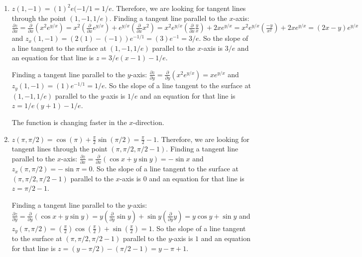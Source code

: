 \begin{Answer}[ref = tangent]
\begin{enumerate}
    \item $z(1, -1) = (1)^2e({-1/1} = 1/e$. Therefore, we are looking for 
    tangent lines through the point $(1, -1, 1/e)$. Finding a tangent line 
    parallel to the $x$-axis: $\frac{\partial z}{\partial x} = \frac{\partial}{
    \partial x} \left( x^2e^{y/x} \right) = x^2 \left( \frac{\partial}{\partial
    x}e^{y/x} \right) + e^{y/x} \left( \frac{\partial}{\partial x}x^2 \right) =
    x^2e^{y/x} \left( \frac{\partial}{\partial x} \frac{y}{x} \right) + 2x
    e^{y/x} = x^2 e^{y/x} \left( \frac{-y}{x^2} \right) + 2xe^{y/x} = \left( 
    2x - y \right)e^{y/x}$ and $z_x(1, -1) = \left( 2(1) - (-1) \right) 
    e^{-1/1} = \left(3 \right)e^{-1} = 3/e$. So the slope of a line tangent to 
    the surface at $(1, -1, 1/e)$ parallel to the $x$-axis is $3/e$ and an 
    equation for that line is $z = 3/e \left(x - 1 \right) - 1/e$. 

    Finding a tangent line parallel to the $y$-axis: $\frac{\partial z}{
    \partial y} = \frac{\partial}{\partial y} \left( x^2e^{y/x} \right) = x
    e^{y/x}$ and $z_y(1, -1) = (1)e^{-1/1} = 1/e$. So the slope of a line 
    tangent to the surface at $(1, -1, 1/e)$ parallel to the $y$-axis is $1/e$ 
    and an equation for that line is $z = 1/e \left(y + 1 \right) - 1/e$. 

    The function is changing faster in the $x$-direction. 

    \item $z(\pi, \pi/2) = \cos{(\pi)} + \frac{\pi}{2}\sin{(\pi/2)} = \frac{
    \pi}{2} - 1 $. Therefore, we are looking for tangent lines through the 
    point $(\pi, \pi/2, \pi/2 - 1)$. Finding a tangent line parallel to the 
    $x$-axis: $\frac{\partial z}{\partial x} = \frac{\partial}{\partial x} 
    \left( \cos{x} + y\sin{y} \right) = -\sin{x}$ and $z_x(\pi, \pi/2) = -\sin{
    \pi} = 0$. So the slope of a line tangent to the surface at $(\pi, \pi/2, 
    \pi/2 - 1)$ parallel to the $x$-axis is $0$ and an equation for that line 
    is $z = \pi/2 - 1$.

    Finding a tangent line parallel to the $y$-axis: $\frac{\partial z}{
    \partial y} = \frac{\partial}{\partial y} \left( \cos{x} + y\sin{y} \right)
    = y \left( \frac{\partial}{\partial y}\sin{y} \right) + \sin{y} \left( 
    \frac{\partial}{\partial y} y \right) = y\cos{y} + \sin{y}$ and $z_y(\pi, 
    \pi/2) = \left( \frac{\pi}{2} \right) \cos{ \left( \frac{\pi}{2} \right) } 
    + \sin{ \left( \frac{\pi}{2} \right) } = 1$. So the slope of a line tangent
    to the surface at $( \pi, \pi/2, \pi/2 - 1 )$ parallel to the $y$-axis is 
    $1$ and an equation for that line is $z = \left( y - \pi/2 \right) - \left(
    \pi/2 - 1 \right) = y - \pi + 1$. 


\end{enumerate}
\end{Answer}

